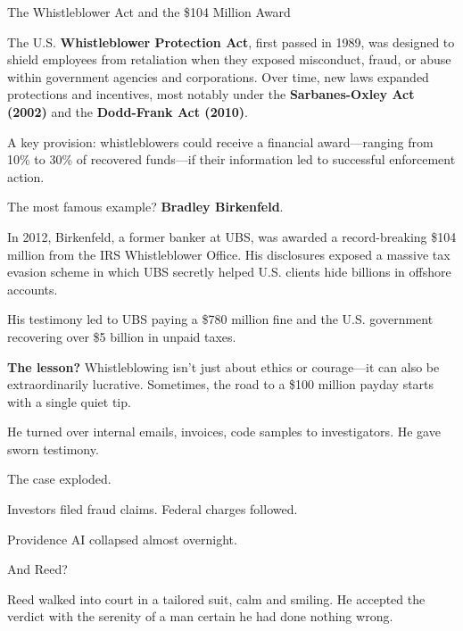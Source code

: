 \begin{HistoricalSidebar}{The Whistleblower Act and the \$104 Million Award}

    The U.S. \textbf{Whistleblower Protection Act}, first passed in 1989, was designed to shield employees from retaliation when they exposed misconduct, fraud, or abuse within government agencies and corporations. Over time, new laws expanded protections and incentives, most notably under the \textbf{Sarbanes-Oxley Act (2002)} and the \textbf{Dodd-Frank Act (2010)}.

    \medskip
    
    A key provision: whistleblowers could receive a financial award—ranging from 10\% to 30\% of recovered funds—if their information led to successful enforcement action.
    
    \medskip
    
    The most famous example? \textbf{Bradley Birkenfeld}.

    \medskip
    
    In 2012, Birkenfeld, a former banker at UBS, was awarded a record-breaking \$104 million from the IRS Whistleblower Office. His disclosures exposed a massive tax evasion scheme in which UBS secretly helped U.S. clients hide billions in offshore accounts.

    \medskip
    
    His testimony led to UBS paying a \$780 million fine and the U.S. government recovering over \$5 billion in unpaid taxes.
    
    \medskip
    
    \textbf{The lesson?} Whistleblowing isn’t just about ethics or courage—it can also be extraordinarily lucrative.  
    Sometimes, the road to a \$100 million payday starts with a single quiet tip.
    
\end{HistoricalSidebar}
   
\medskip

He turned over internal emails, invoices, code samples to investigators.  
He gave sworn testimony.

The case exploded.

Investors filed fraud claims.  
Federal charges followed.

Providence AI\texttrademark{} collapsed almost overnight.

\medskip

And Reed?

Reed walked into court in a tailored suit, calm and smiling.  
He accepted the verdict with the serenity of a man certain he had done nothing wrong.

